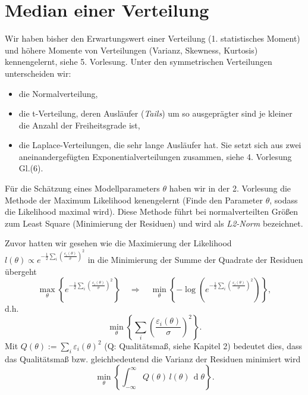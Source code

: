 \section{Median einer Verteilung}
Wir haben bisher den Erwartungswert einer Verteilung (1. statistisches Moment) und höhere Momente von Verteilungen (Varianz, Skewness, Kurtosis) kennengelernt, siehe 5. Vorlesung. Unter den symmetrischen Verteilungen unterscheiden wir:
\begin{itemize}
	\item die Normalverteilung,
	\item die t-Verteilung, deren Ausläufer (\textit{Tails}) um so ausgeprägter sind je kleiner die Anzahl der Freiheitsgrade ist,
	\item die Laplace-Verteilungen, die sehr lange Ausläufer hat. Sie
	setzt sich aus zwei aneinandergefügten Exponentialverteilungen zusammen, siehe
	4. Vorlesung Gl.(6).
\end{itemize}

Für die Schätzung eines Modellparameters $\theta$ haben wir in
der 2. Vorlesung die Methode der Maximum Likelihood kenengelernt
(\glqq Finde den Parameter $\theta$, sodass die Likelihood maximal wird\grqq). Diese Methode führt bei normalverteilten Größen zum Least Square (Minimierung der Residuen) und wird als \textit{L2-Norm} bezeichnet.

Zuvor hatten wir gesehen wie die Maximierung der Likelihood
$l(\theta) \propto e^{-\frac{1}{2}\sum_i \left(\frac{\varepsilon_i(\theta)}{\sigma}\right)^2}$
in die Minimierung der Summe der Quadrate der Residuen übergeht
$$
\max_{\theta} \left\{ e^{-\frac{1}{2}\sum_i \left(\frac{\varepsilon_i(\theta)}{\sigma}\right)^2} \right\}
\quad \Rightarrow \quad
\min_{\theta} \left\{ -\log\left(e^{-\frac{1}{2}\sum_i \left(\frac{\varepsilon_i(\theta)}{\sigma}\right)^2} \right) \right\} ,
$$
d.h.
$$
\min_{\theta} \left\{ \sum_i \left(\frac{\varepsilon_i(\theta)}{\sigma}\right)^2 \right\} .
$$
Mit $Q(\theta) := \sum_i \varepsilon_i(\theta)^2$ (Q: Qualitätsmaß, siehe Kapitel 2) bedeutet dies, dass das Qualitätsmaß bzw. gleichbedeutend die Varianz der Residuen minimiert wird
\begin{equation}
\min_{\theta} \left\{ \int_{-\infty}^{\infty} Q(\theta)  \, l(\theta) \, \operatorname d \theta \right\} .
\end{equation}

